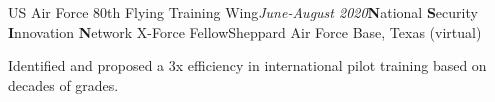 \begin{rSubsection}{US Air Force 80th Flying Training Wing}{\em June-August 2020}{\textbf{N}ational \textbf{S}ecurity \textbf{I}nnovation \textbf{N}etwork X-Force Fellow}{Sheppard Air Force Base, Texas (virtual)}
\item Identified and proposed a 3x efficiency in international pilot training based on decades of grades.
\end{rSubsection}